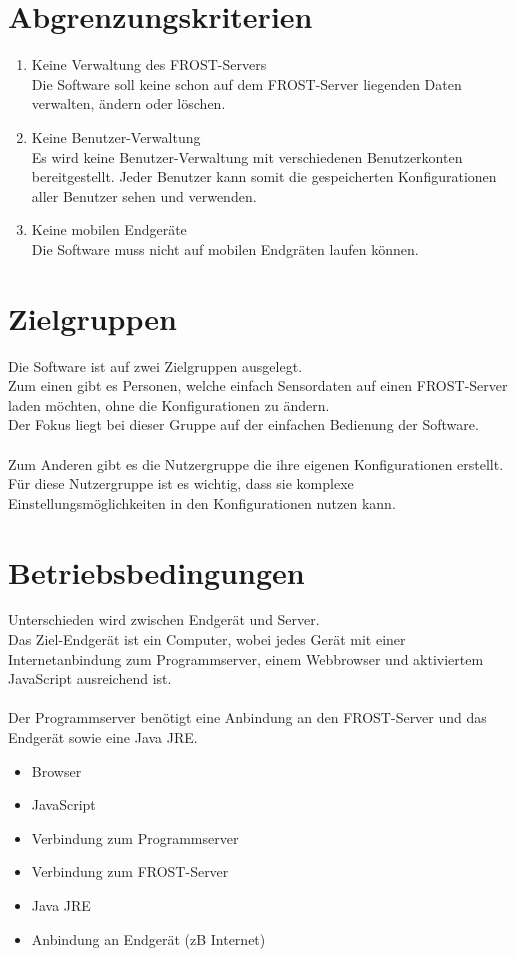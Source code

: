 \documentclass[12 pt]{article}
\begin{document}
\section{Abgrenzungskriterien}
\begin{enumerate}
	\item Keine Verwaltung des FROST-Servers \\
	Die Software soll keine schon auf dem FROST-Server liegenden Daten verwalten, ändern oder löschen.
	\item Keine Benutzer-Verwaltung \\
	Es wird keine Benutzer-Verwaltung mit verschiedenen Benutzerkonten bereitgestellt.
	Jeder Benutzer kann somit die gespeicherten Konfigurationen aller Benutzer sehen und verwenden.
	\item Keine mobilen Endgeräte \\
	Die Software muss nicht auf mobilen Endgräten laufen können.
\end{enumerate}

	
	\section{Zielgruppen}
	Die Software ist auf zwei Zielgruppen ausgelegt.\\
	Zum einen gibt es Personen, welche einfach Sensordaten auf einen FROST-Server laden möchten, ohne die Konfigurationen zu ändern. \\Der Fokus liegt bei dieser Gruppe auf der einfachen Bedienung der Software.\\
	\\Zum Anderen gibt es die Nutzergruppe die ihre eigenen Konfigurationen erstellt. Für diese Nutzergruppe ist es wichtig, dass sie komplexe Einstellungsmöglichkeiten in den Konfigurationen nutzen kann.
	
	\section{Betriebsbedingungen}
	Unterschieden wird zwischen Endgerät und Server. \\
	Das Ziel-Endgerät ist ein Computer, wobei jedes Gerät mit einer Internetanbindung zum Programmserver, einem Webbrowser und aktiviertem JavaScript ausreichend ist.\\
	\ \\
	Der Programmserver benötigt eine Anbindung an den FROST-Server und das Endgerät sowie eine Java JRE.
	\begin{itemize}
		\item Browser
		\item JavaScript
		\item Verbindung zum Programmserver
	\end{itemize}
	\begin{itemize}
		\item Verbindung zum FROST-Server
		\item Java JRE
		\item Anbindung an Endgerät (zB Internet)
	\end{itemize}
	
\end{document}
